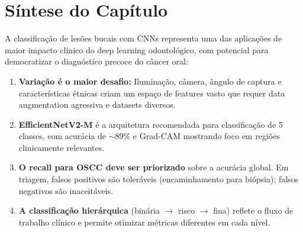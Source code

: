 



\section{Síntese do Capítulo}
\label{sec:sintese-10}

A classificação de lesões bucais com CNNs representa uma das aplicações de
maior impacto clínico do deep learning odontológico, com potencial para
democratizar o diagnóstico precoce do câncer oral:

\begin{enumerate}
  \item \textbf{Variação é o maior desafio:} Iluminação, câmera, ângulo de
        captura e características étnicas criam um espaço de features vasto
        que requer data augmentation agressiva e datasets diversos.
  \item \textbf{EfficientNetV2-M} é a arquitetura recomendada para classificação
        de 5 classes, com acurácia de $\sim$89\% e Grad-CAM mostrando foco em
        regiões clinicamente relevantes.
  \item \textbf{O recall para OSCC deve ser priorizado} sobre a acurácia global.
        Em triagem, falsos positivos são toleráveis (encaminhamento para biópsia);
        falsos negativos são inaceitáveis.
  \item \textbf{A classificação hierárquica} (binária $\to$ risco $\to$ fina)
        reflete o fluxo de trabalho clínico e permite otimizar métricas diferentes
        em cada nível.
\end{enumerate}

